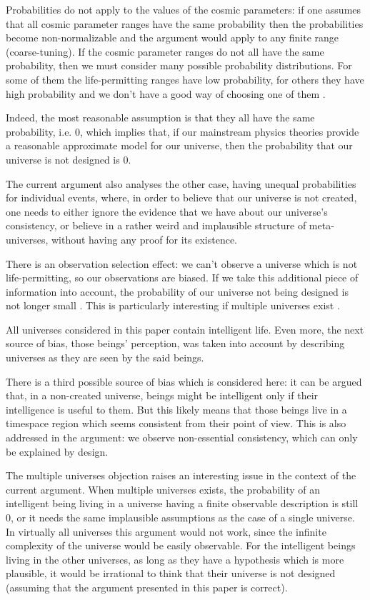 \documentclass[a4paper
,draft
]{article}
\newcommand{\svn}[2][]{\todo[author=Virgil,color=red!25!white,#1]{#2}}
\newcommand{\paper}[1]{paper}
\newcommand{\ghilimele}[1]{``#1"}
\begin{document}
Probabilities do not apply to the values of the cosmic parameters:
if one assumes that all cosmic parameter ranges have the same probability
then the probabilities become non-normalizable and the argument
would apply to any finite range (coarse-tuning).
If the cosmic parameter ranges do not all have the same probability,
then we must consider many possible probability distributions.
For some of them the life-permitting ranges have low probability,
for others they have high probability and we don't have a good way
of choosing one of them \parencites{Manson2009}{McGrew2001}.

Indeed, the most reasonable assumption is that they all have the same
probability, i.e. $0$, which implies that, if our mainstream physics theories
provide a reasonable approximate model for our universe, then the probability
that our universe is not designed is $0$.

The current argument also analyses the other case, having unequal probabilities
for individual events, where, in order to believe that our universe is not
created, one needs to either ignore the evidence that we have about our
universe's consistency, or believe in a rather weird and implausible structure
of meta-universes, without having any proof for its existence.

There is an observation selection effect:
we can't observe a universe which is not life-permitting,
so our observations are biased.
If we take this additional piece of information into account,
the probability of our universe not being designed is not longer
small \parencite{Sober2009}.
This is particularly interesting if multiple universes
exist \parencite{Manson2009}.

All universes considered in this paper contain intelligent life. Even
more, the next source of bias, those beings' perception, was taken into account
by describing universes as they are seen by the said beings.

There is a third possible source of bias which is considered here: it can be
argued that, in a non-created universe, beings might be intelligent
only if their intelligence is useful to them. But this likely means that those
beings live in a timespace region which seems consistent from their point of
view. This is also addressed in the argument: we observe non-essential
consistency, which can only be explained by design.

The multiple universes objection raises an interesting issue in the context
of the current argument.
When multiple universes exists, the probability of an intelligent being
living in a universe having a finite observable description is still $0$, or
it needs the same implausible assumptions as the case of a single universe.
In virtually all universes this argument\svn{axiom ??? instead of
\ghilimele{this argument}} would not work, since the infinite complexity
of the universe would be easily observable.
For the intelligent beings living in the other universes, as long as they have
a hypothesis which is more plausible, it would be irrational to think that
their universe is not designed (assuming that the argument presented in
this \paper{} is correct).
\end{document}

